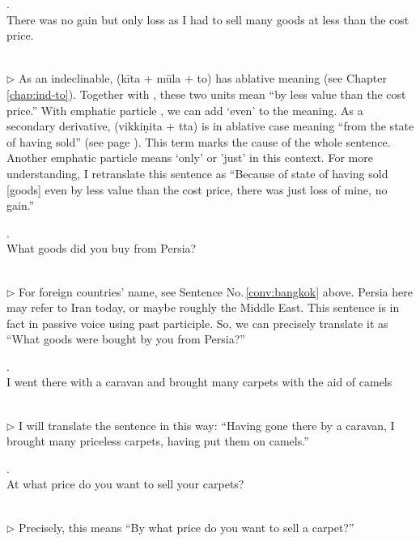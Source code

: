\medskip
\parbox[lt]{0.93\linewidth}{\raggedright{}. \\
\hspace*{6mm}There was no gain but only loss as I had to sell many goods at less than the cost price.}\\[1mm]
{\small $\triangleright$ As an indeclinable,  (k\=ita + m\=ula + to) has ablative meaning (see Chapter \ref{chap:ind-to}). Together with , these two units mean ``by less value than the cost price.'' With emphatic particle , we can add `even' to the meaning. As a secondary derivative,  (vikki\d nita + tta) is in ablative case meaning ``from the state of having sold'' (see page \pageref{pacct8:tta}). This term marks the cause of the whole sentence. Another emphatic particle  means `only' or 'just' in this context. For more understanding, I retranslate this sentence as ``Because of state of having sold [goods] even by less value than the cost price, there was just loss of mine, no gain.''}

\medskip
\parbox[lt]{0.93\linewidth}{\raggedright{}. \\
\hspace*{6mm}What goods did you buy from Persia?}\\[1mm]
{\small $\triangleright$ For foreign countries' name, see Sentence No.\,\ref{conv:bangkok} above. Persia here may refer to Iran today, or maybe roughly the Middle East. This sentence is in fact in passive voice using past participle. So, we can precisely translate it as ``What goods were bought by you from Persia?''}

\medskip
\parbox[lt]{0.93\linewidth}{\raggedright{}. \\
\hspace*{6mm}I went there with a caravan and brought many carpets with the aid of camels}\\[1mm]
{\small $\triangleright$ I will translate the sentence in this way: ``Having gone there by a caravan, I brought many priceless carpets, having put them on camels.''}

\medskip
\parbox[lt]{0.93\linewidth}{\raggedright{}. \\
\hspace*{6mm}At what price do you want to sell your carpets?}\\[1mm]
{\small $\triangleright$ Precisely, this means ``By what price do you want to sell a carpet?''}

